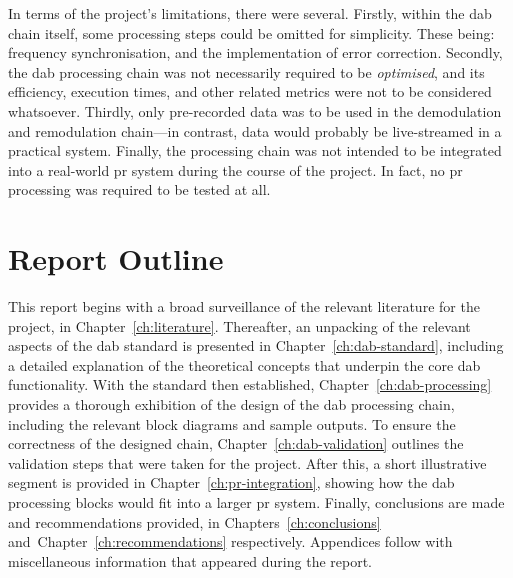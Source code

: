 \documentclass[class=report,11pt,crop=false]{standalone}
\begin{document}
In terms of the project's limitations, there were several. Firstly, within the \gls{dab} chain itself, some processing steps could be omitted for simplicity. These being: frequency synchronisation, and the implementation of error correction. Secondly, the \gls{dab} processing chain was not necessarily required to be \emph{optimised}, and its efficiency, execution times, and other related metrics were not to be considered whatsoever. Thirdly, only pre-recorded data was to be used in the demodulation and remodulation chain---in contrast, data would probably be live-streamed in a practical system. Finally, the processing chain was not intended to be integrated into a real-world \gls{pr} system during the course of the project. In fact, no \gls{pr} processing was required to be tested at all.

\section{Report Outline}
This report begins with a broad surveillance of the relevant literature for the project, in Chapter~\ref{ch:literature}. Thereafter, an unpacking of the relevant aspects of the \gls{dab} standard is presented in Chapter~\ref{ch:dab-standard}, including a detailed explanation of the theoretical concepts that underpin the core \gls{dab} functionality. With the standard then established, Chapter~\ref{ch:dab-processing} provides a thorough exhibition of the design of the \gls{dab} processing chain, including the relevant block diagrams and sample outputs. To ensure the correctness of the designed chain, Chapter~\ref{ch:dab-validation} outlines the validation steps that were taken for the project. After this, a short illustrative segment is provided in Chapter~\ref{ch:pr-integration}, showing how the \gls{dab} processing blocks would fit into a larger \gls{pr} system. Finally, conclusions are made and recommendations provided, in Chapters~\ref{ch:conclusions} and~Chapter~\ref{ch:recommendations} respectively. Appendices follow with miscellaneous information that appeared during the report.



\ifstandalone

\printnoidxglossary[type=\acronymtype,nonumberlist]
\fi
\end{document}
